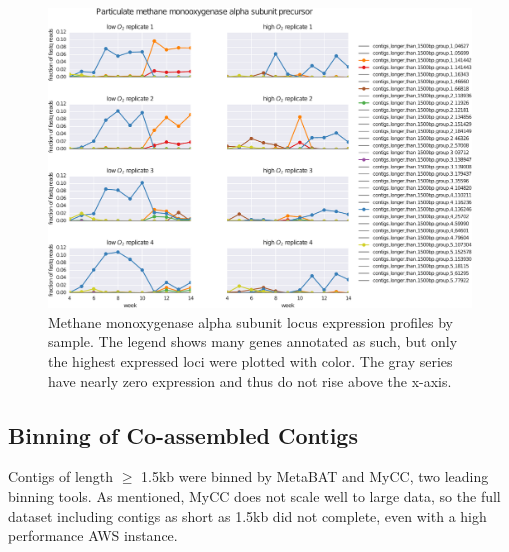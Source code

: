 \begin{figure}[H]
\centering
    \includegraphics[width=1.0\textwidth]{./tex/chapter2/figures/170328_loci_read_fracs_Particulate_methane_monooxygenase_alpha_subunit_precursor--portrait--cleaned.pdf}
    \begin{singlespace}
    \caption[Methane monoxygenase alpha subunit locus expression profiles by sample]{
        Methane monoxygenase alpha subunit locus expression profiles by sample.
        The legend shows many genes annotated as such, but only the highest expressed loci were plotted with color.
        The gray series have nearly zero expression and thus do not rise above the x-axis.
        }
    \label{fig:mmo_alpha}
    \end{singlespace}
\end{figure}

\subsection{Binning of Co-assembled Contigs}

Contigs of length $\geq$ 1.5kb were binned by MetaBAT and MyCC, two leading binning tools.
As mentioned, MyCC does not scale well to large data, so the full dataset including contigs as short as 1.5kb did not complete, even with a high performance AWS instance.

